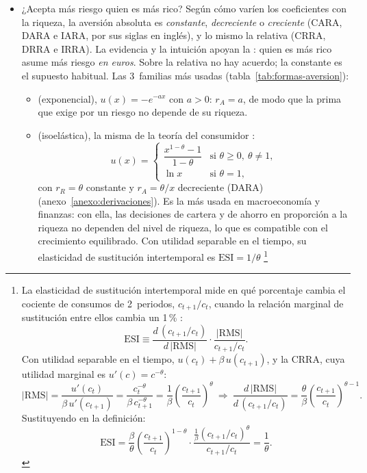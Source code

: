 \documentclass[11pt]{article}
\begin{document}
\begin{itemize}
\item ¿Acepta más riesgo quien es más rico? Según cómo varíen los coeficientes con la riqueza, la aversión absoluta es \emph{constante}, \emph{decreciente} o \emph{creciente} (CARA, DARA e IARA, por sus siglas en inglés), y lo mismo la relativa (CRRA, DRRA e IRRA). La evidencia y la intuición apoyan la : quien es más rico asume más riesgo \emph{en euros}. Sobre la relativa no hay acuerdo; la constante es el supuesto habitual. Las 3~familias más usadas (tabla~\ref{tab:formas-aversion}):
  \begin{itemize}
  \item {} (exponencial), $u(x)=-e^{-ax}$ con $a>0$: $r_A=a$, de modo que la prima que exige por un riesgo no depende de su riqueza.
  \item {} (isoelástica), la misma de la teoría del consumidor :
    \begin{equation}\label{eq:crra}
    u(x)=\begin{cases}\dfrac{x^{1-\theta}-1}{1-\theta} & \text{si } \theta\geq 0,\ \theta\neq 1,\\[6pt] \ln x & \text{si } \theta=1,\end{cases}
    \end{equation}
    con $r_R=\theta$ constante y $r_A=\theta/x$ decreciente (DARA) (anexo~\ref{anexo:derivaciones}). Es la más usada en macroeconomía y finanzas: con ella, las decisiones de cartera y de ahorro en proporción a la riqueza no dependen del nivel de riqueza, lo que es compatible con el crecimiento equilibrado. Con utilidad separable en el tiempo, su elasticidad de sustitución intertemporal es $\mathrm{ESI}=1/\theta$ \footnote{La elasticidad de sustitución intertemporal mide en qué porcentaje cambia el cociente de consumos de 2~periodos, $c_{t+1}/c_t$, cuando la relación marginal de sustitución entre ellos cambia un 1\,\% :
  $$\mathrm{ESI}\equiv\frac{d\,(c_{t+1}/c_t)}{d\,|\mathrm{RMS}|}\cdot\frac{|\mathrm{RMS}|}{c_{t+1}/c_t} .$$
  Con utilidad separable en el tiempo, $u(c_t)+\beta\,u(c_{t+1})$, y la CRRA, cuya utilidad marginal es $u'(c)=c^{-\theta}$:
  $$|\mathrm{RMS}|=\frac{u'(c_t)}{\beta\,u'(c_{t+1})}=\frac{c_t^{-\theta}}{\beta\,c_{t+1}^{-\theta}}=\frac{1}{\beta}\left(\frac{c_{t+1}}{c_t}\right)^{\theta}\ \Longrightarrow\ \frac{d\,|\mathrm{RMS}|}{d\,(c_{t+1}/c_t)}=\frac{\theta}{\beta}\left(\frac{c_{t+1}}{c_t}\right)^{\theta-1} .$$
  Sustituyendo en la definición:
  $$\mathrm{ESI}=\frac{\beta}{\theta}\left(\frac{c_{t+1}}{c_t}\right)^{1-\theta}\cdot\frac{\frac{1}{\beta}\left(c_{t+1}/c_t\right)^{\theta}}{c_{t+1}/c_t}=\frac{1}{\theta} .$$
}
\end{itemize}
\end{itemize}
\end{document}
